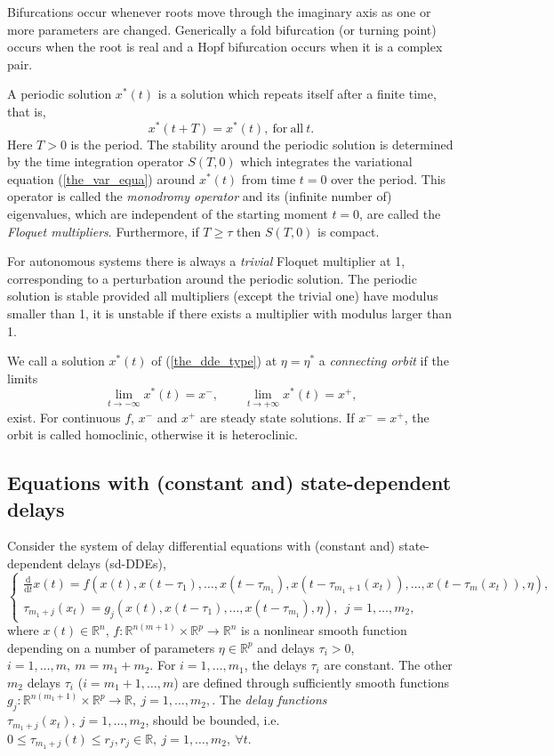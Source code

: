 \documentclass[10pt]{article}
\gdef \define#1{{\em{#1}}}
\gdef \d{{\mathrm d}}
\gdef \RR{{\mathbb R}}
\begin{document}
Bifurcations occur whenever roots move through the imaginary
axis as one or more parameters are changed.
Generically a fold bifurcation (or turning point) occurs when
the root is real and a 
Hopf bifurcation occurs when it is a complex pair.

A periodic solution $x^*(t)$ is a solution which repeats itself after
a finite time, that is,
\[ 
x^*(t+T)=x^*(t),\mathrm{\ for\ all\ }t. 
\]
Here $T>0$ is the period.
The stability around the periodic solution is determined by
the time integration operator $S(T,0)$
which integrates the variational equation
(\ref{the_var_equa}) around $x^*(t)$ from time $t=0$ over
the period.
This operator is called the \define{monodromy operator} and
its (infinite number of) eigenvalues, which
are independent of the starting moment $t=0$,
are called the \define{Floquet multipliers}.
Furthermore, if $T\geq\tau$ then $S(T,0)$ is compact.

For autonomous systems there is always a \define{trivial}
Floquet multiplier at 1, corresponding to a perturbation around
the periodic solution. The periodic solution is stable provided
all multipliers (except the trivial one) have modulus smaller than
1, it is unstable if there exists a multiplier with modulus larger
than 1.

We call a solution $x^*(t)$ of (\ref{the_dde_type}) at $\eta=\eta^*$ a 
\textit{connecting orbit} if the limits 
\begin{equation}
\lim_{t\to -\infty} x^*(t)=x^{-}, \qquad \lim_{t\to +\infty} x^*(t)=x^{+},
\end{equation}
exist.  For continuous $f$, $x^-$ and $x^+$ 
are steady state solutions. 
If $x^-=x^+$, the orbit is called homoclinic, otherwise it is heteroclinic. 

\subsection{Equations with (constant and) state-dependent delays}\label{sd_dde}

Consider the system of delay differential equations with
(constant and) state-dependent delays (sd-DDEs),
\begin{equation}\label{the_dde_type2}
\left\{
\begin{array}{l}
\frac{\d}{\d t}{x(t)}=f(x(t),x(t-\tau_1),\ldots,x(t-\tau_{m_1}),x(t-\tau_{m_1+1}(x_t)),\ldots,x(t-\tau_m(x_t)),\eta),\\
\tau_{m_1+j}(x_t)=g_j(x(t),x(t-\tau_1),\ldots,x(t-\tau_{m_1}),\eta), \: \: 
j=1,\ldots,m_2,
\end{array}
\right.
\end{equation}
where $x(t)\in\RR^n$, $f:\RR^{n(m+1)}\times\RR^p
\rightarrow\RR^n$ is a nonlinear smooth function
depending on a number of parameters $\eta\in\RR^p$ and delays $\tau_i>0$, 
$i=1,\ldots,m,~m=m_1+m_2$.  
For $i=1,\ldots,m_1$, the delays $\tau_i$ are constant.
The other $m_2$ delays $\tau_i$ ($i=m_1+1,\ldots,m$) are defined through 
sufficiently smooth functions $g_j:\RR^{n(m_1+1)}\times\RR^p
\rightarrow\RR,~j=1,\ldots,m_2,$. 
The {\it delay functions} $\tau_{m_1+j}(x_t),~j=1,\ldots,m_2$,
should be bounded, i.e.~$0 \leq \tau_{m_1+j}(t) \leq r_j,
r_j \in \RR,~j=1,\ldots,m_2,~\forall t$. 
\end{document}

